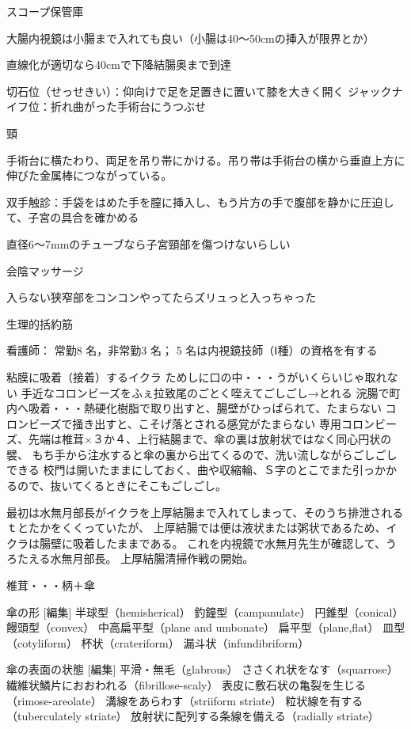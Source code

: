 スコープ保管庫

大腸内視鏡は小腸まで入れても良い（小腸は40～50cmの挿入が限界とか）

直線化が適切なら40cmで下降結腸奥まで到達


切石位（せっせきい）：仰向けで足を足置きに置いて膝を大きく開く
ジャックナイフ位：折れ曲がった手術台にうつぶせ


頸


手術台に横たわり、両足を吊り帯にかける。吊り帯は手術台の横から垂直上方に伸びた金属棒につながっている。

双手触診：手袋をはめた手を膣に挿入し、もう片方の手で腹部を静かに圧迫して、子宮の具合を確かめる

直径6～7mmのチューブなら子宮頸部を傷つけないらしい

会陰マッサージ

入らない狭窄部をコンコンやってたらズリュっと入っちゃった

生理的括約筋

看護師： 常勤8 名，非常勤3 名； 5 名は内視鏡技師（Ⅰ種）の資格を有する

粘膜に吸着（接着）するイクラ
ためしに口の中・・・うがいくらいじゃ取れない
手近なコロンビーズをふぇ拉致尾のごとく咥えてごしごし→とれる
浣腸で町内へ吸着・・・熱硬化樹脂で取り出すと、腸壁がひっぱられて、たまらない
コロンビーズで掻き出すと、こそげ落とされる感覚がたまらない
専用コロンビーズ、先端は椎茸×３か４、上行結腸まで、傘の裏は放射状ではなく同心円状の襞、
もち手から注水すると傘の裏から出てくるので、洗い流しながらごしごしできる
校門は開いたままにしておく、曲や収縮輪、Ｓ字のとこでまた引っかかるので、抜いてくるときにそこもごしごし。

最初は水無月部長がイクラを上厚結腸まで入れてしまって、そのうち排泄されるｔとたかをくくっていたが、
上厚結腸では便は液状または粥状であるため、イクラは腸壁に吸着したままである。
これを内視鏡で水無月先生が確認して、うろたえる水無月部長。
上厚結腸清掃作戦の開始。


椎茸・・・柄＋傘

傘の形 [編集]
半球型（hemisherical）
釣鐘型（campanulate）
円錐型（conical）
饅頭型（convex）
中高扁平型（plane and umbonate）
扁平型（plane,flat）
皿型（cotyliform）
杯状（crateriform）
漏斗状（infundibriform）

傘の表面の状態 [編集]
平滑・無毛（glabrous）
ささくれ状をなす（squarrose）
繊維状鱗片におおわれる（fibrillose-scaly）
表皮に敷石状の亀裂を生じる（rimose-areolate）
溝線をあらわす（striiform striate）
粒状線を有する（tuberculately striate）
放射状に配列する条線を備える（radially striate）

